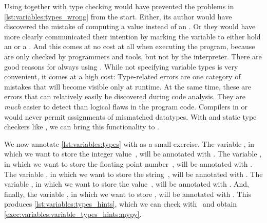 Using  together with type checking would have prevented the problems in \cref{lst:variables:types_wrong} from the start.
Either, its author would have discovered the mistake of computing a  value instead of an .
Or they would have more clearly communicated their intention by marking the variable to either hold an  or a .
And this comes at no cost at all when executing the program, because  are only checked by programmers and tools, but not by the interpreter.%
%
%
%
There are good reasons for always using .
While not specifying variable types is very convenient, it comes at a high cost:%
%
%
%
Type-related errors are one category of mistakes that will become visible only at runtime.
At the same time, these are errors that can relatively easily be discovered during code analysis.
They are \emph{much} easier to detect than logical flaws in the program code.
Compilers in  or  would never permit assignments of mismatched datatypes.
With  and static type checkers like \mypy, we can bring this functionality to \python.%
%
%
%
%
%

We now annotate \cref{lst:variables:types} with  as a small exercise.
The variable , in which we want to store the integer value~, will be annotated with .
The variable , in which we want to store the floating point number~, will be annotated with .
The variable , in which we want to store the string~, will be annotated with .
The variable , in which we want to store the value~, will be annotated with .
And, finally, the variable , in which we want to store , will be annotated with .
This produces \cref{lst:variables:types_hints}, which we can check with \mypy\ and obtain \cref{exec:variables:variable_types_hints:mypy}.

